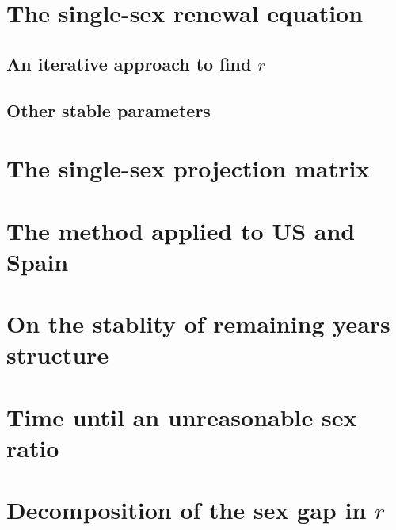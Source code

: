     \section{The single-sex renewal equation}
      
      
      \subsection{An iterative approach to find $r$}
        
        
      \subsection{Other stable parameters}
        
      
    \section{The single-sex projection matrix}
      

    \section{The method applied to US and Spain}
      

    \section{On the stablity of remaining years structure}
      
      
    \section{Time until an unreasonable sex ratio}
      
      
    \section{Decomposition of the sex gap in $r$}
      
      
